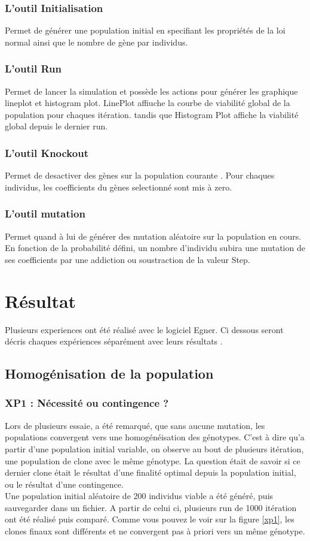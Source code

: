 \documentclass{article}
\begin{document}
	\subsubsection {L'outil Initialisation}
	Permet de générer une population initial en specifiant les propriétés de la loi normal ainsi que le nombre de gène par individus.
	\subsubsection{ L'outil Run}
	Permet de lancer la simulation et possède les actions pour générer les graphique lineplot et histogram plot. LinePlot affiuche la courbe de viabilité global de la population pour chaques itération. tandis que Histogram Plot affiche la viabilité global depuis le dernier run. 
	\subsubsection{L'outil Knockout}
	Permet de desactiver des gènes sur la population courante . Pour chaques individus, les coefficients du gènes selectionné sont mis à zero. 
	\subsubsection{L'outil mutation}
	Permet quand à lui de générer des mutation aléatoire sur la population en cours. En fonction de la probabilité défini, un nombre d'individu subira une mutation de ses coefficients par une addiction ou soustraction de la valeur Step.

	


	\section {Résultat}
	Plusieurs experiences ont été réalisé avec le logiciel Egner. Ci dessous seront décris chaques expériences séparément avec leurs résultats .

	\subsection{Homogénisation de la population}
	\subsubsection{XP1 : Nécessité ou contingence ?}
	Lors de plusieurs essaie, a été remarqué, que sans aucune mutation, les populations convergent vers une homogénéisation des génotypes. C'est à dire qu'a partir d'une population initial variable, on observe au bout de plusieurs itération, une population de clone avec le même génotype. La question était de savoir si ce dernier clone était le résultat d'une finalité optimal depuis la population initial, ou le résultat d'une contingence. \\
	Une population initial aléatoire de 200 individus viable a été généré, puis sauvegarder dans un fichier. A partir de celui ci, plusieurs run de 1000 itération ont été réalisé puis comparé. Comme vous pouvez le voir sur la figure \ref{xp1}, les clones finaux sont différents et ne convergent pas à priori vers un même génotype. 
\end{document}
